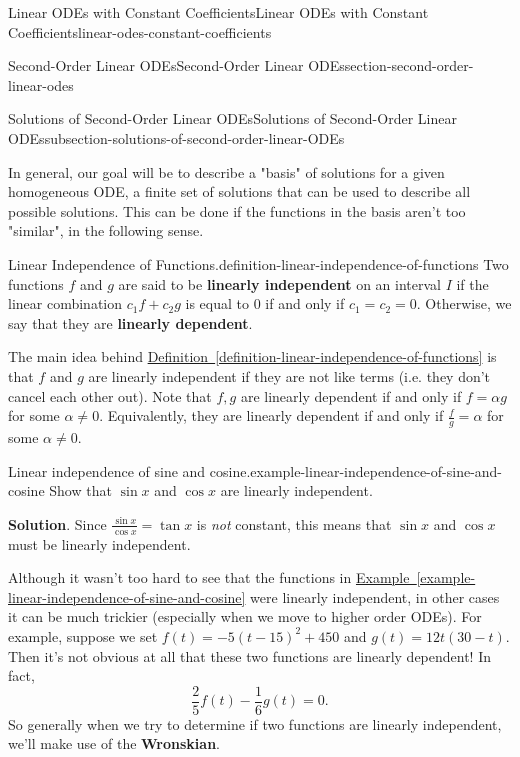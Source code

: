 \documentclass[oneside,10pt,]{book}
\newcommand{\terminology}[1]{\textbf{#1}}
\numberwithin{equation}{section}
\begin{document}
\begin{chapterptx}{Linear ODEs with Constant Coefficients}{}{Linear ODEs with Constant Coefficients}{}{}{linear-odes-constant-coefficients}
\begin{sectionptx}{Second-Order Linear ODEs}{}{Second-Order Linear ODEs}{}{}{section-second-order-linear-odes}
\begin{subsectionptx}{Solutions of Second-Order Linear ODEs}{}{Solutions of Second-Order Linear ODEs}{}{}{subsection-solutions-of-second-order-linear-ODEs}
\par
\hypertarget{p-163}{}%
In general, our goal will be to describe a "basis" of solutions for a given homogeneous ODE, a finite set of solutions that can be used to describe all possible solutions. This can be done if the functions in the basis aren't too "similar", in the following sense.%
\begin{definition}{Linear Independence of Functions.}{definition-linear-independence-of-functions}%
\hypertarget{p-164}{}%
Two functions \(f\) and \(g\) are said to be \terminology{linearly independent} on an interval \(I\) if the linear combination \(c_{1}f + c_{2}g\) is equal to \(0\) if and only if \(c_{1} = c_{2} = 0\). Otherwise, we say that they are \terminology{linearly dependent}.%
\end{definition}
\hypertarget{p-165}{}%
The main idea behind \hyperref[definition-linear-independence-of-functions]{Definition~\ref{definition-linear-independence-of-functions}} is that \(f\) and \(g\) are linearly independent if they are not like terms (i.e. they don't cancel each other out). Note that \(f,g\) are linearly dependent if and only if \(f = \alpha g\) for some \(\alpha\neq 0\). Equivalently, they are linearly dependent if and only if \(\frac{f}{g} = \alpha\) for some \(\alpha\neq0\).%
\begin{example}{Linear independence of sine and cosine.}{example-linear-independence-of-sine-and-cosine}%
\hypertarget{p-166}{}%
Show that \(\sin x\) and \(\cos x\) are linearly independent.%
\par\smallskip%
\noindent\textbf{Solution}.\hypertarget{solution-26}{}\quad%
\hypertarget{p-167}{}%
Since \(\frac{\sin x}{\cos x} = \tan x\) is \emph{not} constant, this means that \(\sin x\) and \(\cos x\) must be linearly independent.%
\end{example}
\hypertarget{p-168}{}%
Although it wasn't too hard to see that the functions in \hyperref[example-linear-independence-of-sine-and-cosine]{Example~\ref{example-linear-independence-of-sine-and-cosine}} were linearly independent, in other cases it can be much trickier (especially when we move to higher order ODEs). For example, suppose we set \(f(t) = -5(t-15)^{2} + 450\) and \(g(t) = 12t(30-t)\). Then it's not obvious at all that these two functions are linearly dependent! In fact,%
\begin{equation*}
\frac{2}{5}f(t) - \frac{1}{6}g(t) = 0.
\end{equation*}
So generally when we try to determine if two functions are linearly independent, we'll make use of the \terminology{Wronskian}.%

\end{subsectionptx}
\end{sectionptx}
\end{chapterptx}
\end{document}
